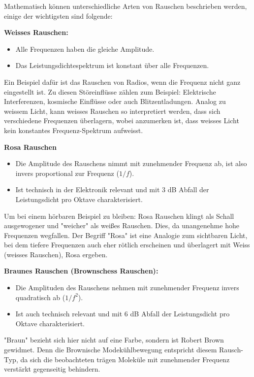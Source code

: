 Mathematisch können unterschiedliche Arten von Rauschen beschrieben werden, einige der wichtigsten sind folgende: 

\begin{definition}{\bf Weisses Rauschen:}
	\begin{itemize}
		\item Alle Frequenzen haben die gleiche Amplitude.
		\item Das Leistungsdichtespektrum ist konstant über alle Frequenzen. 
	\end{itemize}
	Ein Beispiel dafür ist das Rauschen von Radios, wenn die Frequenz nicht ganz eingestellt ist. Zu diesen Störeinflüsse zählen zum Beispiel: Elektrische Interferenzen, kosmische Einflüsse oder auch Blitzentladungen. Analog zu weissem Licht, kann weisses Rauschen so interpretiert werden, dass sich verschiedene Frequenzen überlagern, wobei anzumerken ist, dass weisses Licht kein konstantes Frequenz-Spektrum aufweisst.
\end{definition}

\begin{definition}{\bf Rosa Rauschen}
	\begin{itemize}
		\item Die Amplitude des Rauschens nimmt mit zunehmender Frequenz ab, ist also invers proportional zur Frequenz ($ 1/f $).
		\item Ist technisch in der Elektronik relevant und mit 3 dB Abfall der Leistungsdicht pro Oktave charakterisiert.
	\end{itemize}
	Um bei einem hörbaren Beispiel zu bleiben: Rosa Rauschen klingt als Schall ausgewogener und "weicher" als weißes Rauschen. Dies, da unangenehme hohe Frequenzen wegfallen. Der Begriff "Rosa" ist eine Analogie zum sichtbaren Licht, bei dem tiefere Frequenzen auch eher rötlich erscheinen und überlagert mit Weiss (weisses Rauschen), Rosa ergeben.
\end{definition}

\begin{definition}{\bf Braunes Rauschen (Brownschess Rauschen):}
	\begin{itemize}
		\item Die Amplituden des Rauschens nehmen mit zunehmender Frequenz invers quadratisch ab ($ 1/f^2 $).
		\item Ist auch technisch relevant und mit 6 dB Abfall der Leistungsdicht pro Oktave charakterisiert.
	\end{itemize}
	"Braun" bezieht sich hier nicht auf eine Farbe, sondern ist Robert Brown gewidmet. Denn die Brownische Modekühlbewegung entspricht diesem Rausch-Typ, da sich die beobachteten trägen Moleküle mit zunehmender Frequenz verstärkt gegenseitig behindern.
\end{definition}

